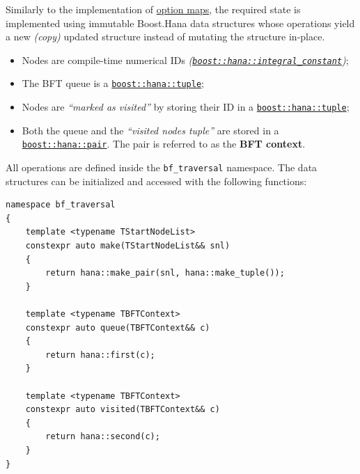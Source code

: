 \documentclass[oneside, 12pt, a4paper, openany]{book}
\begin{document}
Similarly to the implementation of
\protect\hyperlink{metaprogramming_option_maps}{option maps}, the
required state is implemented using immutable Boost.Hana data structures
whose operations yield a new \emph{(copy)} updated structure instead of
mutating the structure in-place.

\begin{itemize}
\item
  Nodes are compile-time numerical IDs
  \emph{(\href{http://www.boost.org/doc/libs/1_61_0/libs/hana/doc/html/structboost_1_1hana_1_1integral__constant.html}{\texttt{boost::hana::integral_constant}})};
\item
  The BFT queue is a
  \href{http://www.boost.org/doc/libs/1_61_0/libs/hana/doc/html/structboost_1_1hana_1_1tuple.html}{\texttt{boost::hana::tuple}};
\item
  Nodes are \emph{``marked as visited''} by storing their ID in a
  \href{http://www.boost.org/doc/libs/1_61_0/libs/hana/doc/html/structboost_1_1hana_1_1tuple.html}{\texttt{boost::hana::tuple}};
\item
  Both the queue and the \emph{``visited nodes tuple''} are stored in a
  \href{http://www.boost.org/doc/libs/1_61_0/libs/hana/doc/html/structboost_1_1hana_1_1pair.html}{\texttt{boost::hana::pair}}.
  The pair is referred to as the \textbf{BFT context}.
\end{itemize}

All operations are defined inside the
\texttt{bf_traversal}
namespace. The data structures can be initialized and accessed with the
following functions:

\begin{verbatim}
namespace bf_traversal
{
    template <typename TStartNodeList>
    constexpr auto make(TStartNodeList&& snl)
    {
        return hana::make_pair(snl, hana::make_tuple());
    }

    template <typename TBFTContext>
    constexpr auto queue(TBFTContext&& c)
    {
        return hana::first(c);
    }

    template <typename TBFTContext>
    constexpr auto visited(TBFTContext&& c)
    {
        return hana::second(c);
    }
}
\end{verbatim}
\end{document}
